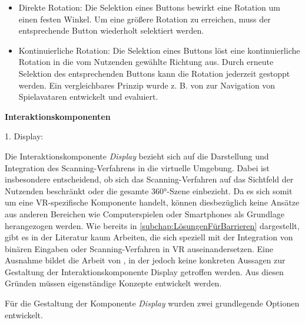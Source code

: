 \begin{itemize}
    \item Direkte Rotation: Die Selektion eines Buttons bewirkt eine Rotation um einen festen Winkel. Um eine größere Rotation zu erreichen, muss der entsprechende Button wiederholt selektiert werden.
    \item Kontinuierliche Rotation: Die Selektion eines Buttons löst eine kontinuierliche Rotation in die vom Nutzenden gewählte Richtung aus. Durch erneute Selektion des entsprechenden Buttons kann die Rotation jederzeit gestoppt werden. Ein vergleichbares Prinzip wurde z. B. von \citet{10.1145/2159365.2159386} zur Navigation von Spielavataren entwickelt und evaluiert. 
\end{itemize}

{\normalfont \bfseries Interaktionskomponenten}  

1. Display:

Die Interaktionskomponente \textit{Display} bezieht sich auf die Darstellung und Integration des Scanning-Verfahrens in die virtuelle Umgebung. Dabei ist insbesondere entscheidend, ob sich das Scanning-Verfahren auf das Sichtfeld der Nutzenden beschränkt oder die gesamte 360°-Szene einbezieht. Da es sich somit um eine VR-spezifische Komponente handelt, können diesbezüglich keine Ansätze aus anderen Bereichen wie Computerspielen oder Smartphones als Grundlage herangezogen werden. Wie bereits in \autoref{subchap:LösungenFürBarrieren} dargestellt, gibt es in der Literatur kaum Arbeiten, die sich speziell mit der Integration von binären Eingaben oder Scanning-Verfahren in VR auseinandersetzen. Eine Ausnahme bildet die Arbeit von \citet{valakou_framework_2024}, in der jedoch keine konkreten Aussagen zur Gestaltung der Interaktionskomponente Display getroffen werden. Aus diesen Gründen müssen eigenständige Konzepte entwickelt werden.

Für die Gestaltung der Komponente \textit{Display} wurden zwei grundlegende Optionen entwickelt.


